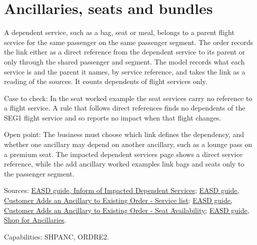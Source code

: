 
\section{Ancillaries, seats and bundles}


\begin{definition}
  \label{def:ancillaries-service-dependency}
  A dependent service, such as a bag, seat or meal, belongs to a parent
  flight service for the same passenger on the same passenger segment. The
  order records the link either as a direct reference from the dependent
  service to its parent or only through the shared passenger and segment.
  The model records what each service is and the parent it names, by
  service reference, and takes the link as a reading of the sources.  It
  counts dependents of flight services only.

  Case to check: In the seat worked example the seat services carry no
  reference to a flight service. A rule that follows direct references finds
  no dependents of the SEG1 flight service and so reports no impact when
  that flight changes.

  Open point: The business must choose which link defines the dependency,
  and whether one ancillary may depend on another ancillary, such as a
  lounge pass on a premium seat. The impacted dependent services page shows
  a direct service reference, while the add ancillary worked examples link
  bags and seats only to the passenger segment.

  Sources: \href{https://standards.atlassian.net/wiki/spaces/EASD/pages/672825400}{EASD guide, Inform of Impacted Dependent Services};
  \href{https://standards.atlassian.net/wiki/spaces/EASD/pages/842301531}{EASD guide, Customer Adds an Ancillary to Existing Order - Service list};
  \href{https://standards.atlassian.net/wiki/spaces/EASD/pages/842268814}{EASD guide, Customer Adds an Ancillary to Existing Order - Seat Availability};
  \href{https://standards.atlassian.net/wiki/spaces/EASD/pages/574226524}{EASD guide, Shop for Ancillaries}.

  Capabilities: SHPANC, ORDRE2.
\end{definition}


